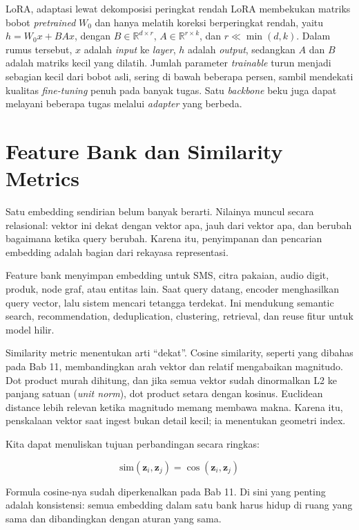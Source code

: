 \begin{pendalaman}{LoRA, adaptasi lewat dekomposisi peringkat rendah}
LoRA membekukan matriks bobot \emph{pretrained} \(W_0\) dan hanya melatih koreksi berperingkat rendah, yaitu \(h = W_0 x + BAx\), dengan \(B \in \mathbb{R}^{d \times r}\), \(A \in \mathbb{R}^{r \times k}\), dan \(r \ll \min(d, k)\). Dalam rumus tersebut, \(x\) adalah \emph{input} ke \emph{layer}, \(h\) adalah \emph{output}, sedangkan \(A\) dan \(B\) adalah matriks kecil yang dilatih. Jumlah parameter \emph{trainable} turun menjadi sebagian kecil dari bobot asli, sering di bawah beberapa persen, sambil mendekati kualitas \emph{fine-tuning} penuh pada banyak tugas. Satu \emph{backbone} beku juga dapat melayani beberapa tugas melalui \emph{adapter} yang berbeda.
\end{pendalaman}

\section{Feature Bank dan Similarity Metrics}\label{feature-bank-dan-similarity-metrics}

Satu embedding sendirian belum banyak berarti. Nilainya muncul secara relasional: vektor ini dekat dengan vektor apa, jauh dari vektor apa, dan berubah bagaimana ketika query berubah. Karena itu, penyimpanan dan pencarian embedding adalah bagian dari rekayasa representasi.

Feature bank menyimpan embedding untuk SMS, citra pakaian, audio digit, produk, node graf, atau entitas lain. Saat query datang, encoder menghasilkan query vector, lalu sistem mencari tetangga terdekat. Ini mendukung semantic search, recommendation, deduplication, clustering, retrieval, dan reuse fitur untuk model hilir.

Similarity metric menentukan arti ``dekat''. Cosine similarity, seperti yang dibahas pada Bab 11, membandingkan arah vektor dan relatif mengabaikan magnitudo. Dot product murah dihitung, dan jika semua vektor sudah dinormalkan L2 ke panjang satuan (\emph{unit norm}), dot product setara dengan kosinus. Euclidean distance lebih relevan ketika magnitudo memang membawa makna. Karena itu, penskalaan vektor saat ingest bukan detail kecil; ia menentukan geometri index.

Kita dapat menuliskan tujuan perbandingan secara ringkas:

\[
\text{sim}(\mathbf{z}_i, \mathbf{z}_j) = \cos(\mathbf{z}_i, \mathbf{z}_j)
\]

Formula cosine-nya sudah diperkenalkan pada Bab 11. Di sini yang penting adalah konsistensi: semua embedding dalam satu bank harus hidup di ruang yang sama dan dibandingkan dengan aturan yang sama.

